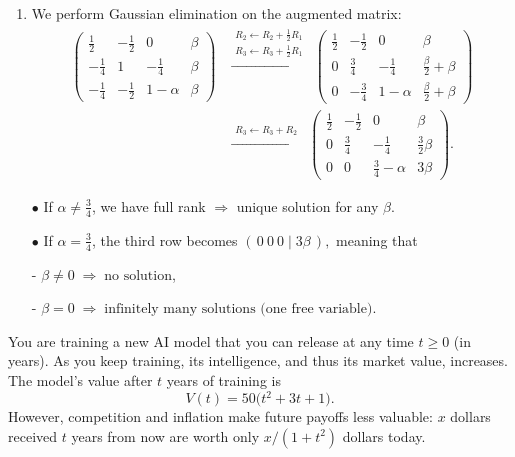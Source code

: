 \documentclass[11pt]{exam}
\begin{document}
\begin{questions}
\begin{solution}[0cm]
\begin{enumerate}[leftmargin = 0.5cm, label = (\alph*), rightmargin = 0.2cm]
    \item 
    We perform Gaussian elimination on the augmented matrix:
    \begin{align*}
        \left(
        \begin{array}{ccc|c}
             \tfrac12 & -\tfrac12 & 0 & \beta \\
             -\tfrac14 & 1 & -\tfrac14 & \beta \\
             -\tfrac14 & -\tfrac12 & 1-\alpha  & \beta
        \end{array}
        \right)
        &\xrightarrow{\substack{R_2 \gets R_2 + \tfrac12 R_1 \\ R_3 \gets R_3 + \tfrac12 R_1}}\ 
        \left(
        \begin{array}{ccc|c}
             \tfrac12 & -\tfrac12 & 0 & \beta \\
             0 & \tfrac34 & -\tfrac14 & \tfrac{\beta}{2} + \beta \\
             0 & -\tfrac34 & 1-\alpha & \tfrac{\beta}{2} + \beta
        \end{array}
        \right)\\
        &\xrightarrow{\substack{R_3 \gets R_3 + R_2}}\
        \left(
        \begin{array}{ccc|c}
             \tfrac12 & -\tfrac12 & 0 & \beta \\
             0 & \tfrac34 & -\tfrac14 & \tfrac{3}{2}\beta \\
             0 & 0 & \tfrac34 - \alpha & 3\beta
        \end{array}
        \right).
    \end{align*}
    
    $\bullet$ If $\alpha \neq \tfrac34$, we have full rank $\Rightarrow$ unique solution for any $\beta$.
    
    $\bullet$ If $\alpha = \tfrac34$, the third row becomes
      $
        (\,0\ 0\ 0\mid 3\beta\,), 
      $
      meaning that
      
      {\qquad - $\beta \neq 0 \;\Rightarrow\; \text{no solution}$,} 
      
      {\qquad - $\beta = 0 \;\Rightarrow\; \text{infinitely many solutions (one free variable)}$.}
\end{enumerate}
\end{solution}



\question[2]     
You are training a new AI model that you can release at any time $t \ge 0$ (in years). As you keep training, its intelligence, and thus its market value, increases. The model's value after $t$ years of training is
\[
V(t) = 50\bigl(t^2 + 3t + 1\bigr).
\]
However, competition and inflation make future payoffs less valuable: $x$ dollars received $t$ years from now are worth only $x/(1 + t^2)$ dollars today.


\end{questions}
\end{document}
